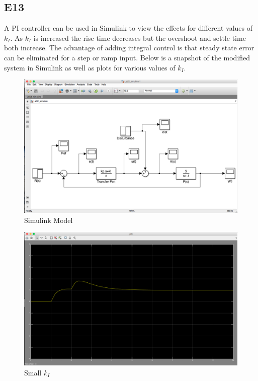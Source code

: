 \documentclass[10pt,titlepage]{article}
\begin{document}
	\subsection*{E13}
	A PI controller can be used in Simulink to view the effects for different values of $k_I$. As $k_I$ is increased the rise time decreases but the overshoot and settle time both increase. The advantage of adding integral control is that steady state error can be eliminated for a step or ramp input. Below is a snapshot of the modified system in Simulink as well as plots for various values of $k_I$.
	\begin{figure}[H]
		\centering
		\includegraphics[scale=0.3]{e13-1}
		\caption{Simulink Model}
	\end{figure}
	\begin{figure}[H]
		\centering
		\includegraphics[scale=0.3]{e13-2}
		\caption{Small $k_I$}
	\end{figure}
\end{document}
